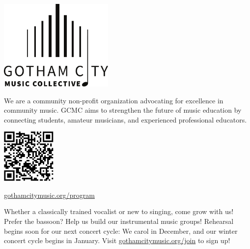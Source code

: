 \documentclass{article}[10pt]
\newcommand{\logo}{
        {\includegraphics[width=0.42\textwidth]{../../graphic_design_assets/bw_logo_full}}
}
\newcommand{\tunedspace}{\vspace{0.15in}}
\begin{document}
    \pagebreak


    \begin{center}
    {\logo}

        \tunedspace

        \begin{minipage}{4in}


            \begin{small}
                We are a community non-profit organization advocating for excellence in community music.
                GCMC aims to strengthen the future of music education by connecting students, amateur musicians, and experienced professional educators.
            \end{small}

            \begin{center}
            {\textbf{}}

                \vspace{0.1in}

                {\includegraphics[width=0.2\textwidth]{../../graphic_design_assets/gotham_city_music_collective_program.png}}

                \href{https://gothamcitymusic.org/program}{gothamcitymusic.org/program}
            \end{center}

            \begin{center}
            {\textbf{}}
            \end{center}

            \vspace{-0.1in}

            \begin{small}
                Whether a classically trained vocalist or new to singing, come grow with us!
                Prefer the bassoon?
                Help us build our instrumental music groups!
                Rehearsal begins soon for our next concert cycle:
                We carol in December, and our winter concert cycle begins in January.
                Visit {\href{gothamcitymusic.org/join}{gothamcitymusic.org/join}} to sign up!
            \end{small}


\end{minipage}
\end{center}
\end{document}
